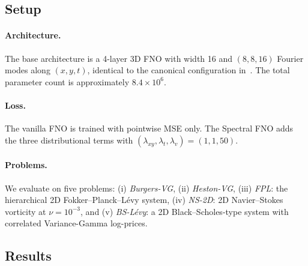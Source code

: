 \documentclass[review,12pt]{elsarticle}
\begin{document}
\subsection{Setup}
\label{subsec:fno-setup}

\paragraph{Architecture.}
The base architecture is a 4-layer 3D FNO with width 16 and
$(8, 8, 16)$ Fourier modes along $(x, y, t)$, identical to the
canonical configuration in~\cite{Li2021FNO}. The total parameter
count is approximately $8.4 \times 10^{6}$.

\paragraph{Loss.}
The vanilla FNO is trained with pointwise MSE only. The Spectral
FNO adds the three distributional terms with
$(\lambda_{xy}, \lambda_{t}, \lambda_{v}) = (1, 1, 50)$.

\paragraph{Problems.}
We evaluate on five problems:
(i) \emph{Burgers-VG}, (ii) \emph{Heston-VG},
(iii) \emph{FPL}: the hierarchical 2D Fokker--Planck--L\'evy system,
(iv) \emph{NS-2D}: 2D Navier--Stokes vorticity at $\nu = 10^{-3}$,
and (v) \emph{BS-L\'evy}: a 2D Black--Scholes-type system with
correlated Variance-Gamma log-prices.

\subsection{Results}
\label{subsec:fno-results}
\end{document}
